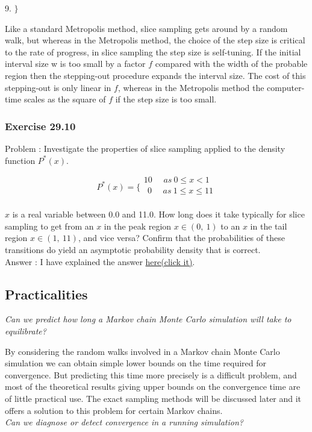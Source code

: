 \documentclass[a4paper,11pt]{article}
\numberwithin{equation}{section}
\begin{document}
{9. $\}$  

$$
$$
Like a standard Metropolis method, slice sampling gets around by a random
walk, but whereas in the Metropolis method, the choice of the step size is critical to the rate of progress, in slice sampling the step size is self-tuning. If
the initial interval size w is too small by a factor $f$ compared with the width of
the probable region then the stepping-out procedure expands the interval size.
The cost of this stepping-out is only linear in $f$, whereas in the Metropolis
method the computer-time scales as the square of $f$ if the step size is too
small.


\subsubsection{Exercise 29.10}
Problem : Investigate the properties of slice sampling applied to the
density function $P^*(x)$. 

$$
P^*(x)= \{
\begin{array}{cc}
10 ~~~~~~as ~0\leq x<1\\
~~0 ~~~~~~as ~1\leq x \leq 11\\
\end{array}
$$

$x$ is a real variable between 0.0 and 11.0.
How long does it take typically for slice sampling to get from an $x$ in
the peak region $x  \in (0,~ 1)$ to an $x$ in the tail region $x \in (1,~11)$, and vice
versa? Confirm that the probabilities of these transitions do yield an
asymptotic probability density that is correct.
$$
$$
Answer : I have explained the answer 
 \href{https://github.com/physhik/Study-of-David-Mackay-s-book-/blob/master/Exercise29.10.ipynb}{here(click it)}.

\subsection{Practicalities}

{\it Can we predict how long a Markov chain Monte Carlo simulation
will take to equilibrate?} 

By considering the random walks involved in a
Markov chain Monte Carlo simulation we can obtain simple lower bounds on
the time required for convergence. But predicting this time more precisely is a
difficult problem, and most of the theoretical results giving upper bounds on
the convergence time are of little practical use. The exact sampling methods
 will be discussed later and it offers a solution to this problem for certain Markov chains.
$$
$$
{\it Can we diagnose or detect convergence in a running simulation?}

}
\end{document}

